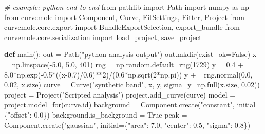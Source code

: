 \documentclass[
  10pt,
  a4paper,
  oneside]{scrreprt}
\newenvironment{Shaded}{}{}
\newcommand{\BuiltInTok}[1]{#1}
\newcommand{\CommentTok}[1]{\textcolor[rgb]{0.38,0.63,0.69}{\textit{#1}}}
\newcommand{\DecValTok}[1]{\textcolor[rgb]{0.25,0.63,0.44}{#1}}
\newcommand{\FloatTok}[1]{\textcolor[rgb]{0.25,0.63,0.44}{#1}}
\newcommand{\ImportTok}[1]{#1}
\newcommand{\KeywordTok}[1]{\textcolor[rgb]{0.00,0.44,0.13}{\textbf{#1}}}
\newcommand{\NormalTok}[1]{#1}
\newcommand{\OperatorTok}[1]{\textcolor[rgb]{0.40,0.40,0.40}{#1}}
\newcommand{\StringTok}[1]{\textcolor[rgb]{0.25,0.44,0.63}{#1}}
\newcommand{\VariableTok}[1]{\textcolor[rgb]{0.10,0.09,0.49}{#1}}
\begin{document}
\begin{Shaded}
\begin{Highlighting}[]
\CommentTok{\# example: python{-}end{-}to{-}end}
\ImportTok{from}\NormalTok{ pathlib }\ImportTok{import}\NormalTok{ Path}
\ImportTok{import}\NormalTok{ numpy }\ImportTok{as}\NormalTok{ np}
\ImportTok{from}\NormalTok{ curvemole }\ImportTok{import}\NormalTok{ Component, Curve, FitSettings, Fitter, Project}
\ImportTok{from}\NormalTok{ curvemole.core.export }\ImportTok{import}\NormalTok{ BundleExportSelection, export\_bundle}
\ImportTok{from}\NormalTok{ curvemole.core.serialization }\ImportTok{import}\NormalTok{ load\_project, save\_project}


\KeywordTok{def}\NormalTok{ main():}
\NormalTok{    out }\OperatorTok{=}\NormalTok{ Path(}\StringTok{"python{-}analysis{-}output"}\NormalTok{)}
\NormalTok{    out.mkdir(exist\_ok}\OperatorTok{=}\VariableTok{False}\NormalTok{)}
\NormalTok{    x }\OperatorTok{=}\NormalTok{ np.linspace(}\OperatorTok{{-}}\FloatTok{5.0}\NormalTok{, }\FloatTok{5.0}\NormalTok{, }\DecValTok{401}\NormalTok{)}
\NormalTok{    rng }\OperatorTok{=}\NormalTok{ np.random.default\_rng(}\DecValTok{1729}\NormalTok{)}
\NormalTok{    y }\OperatorTok{=} \FloatTok{0.4} \OperatorTok{+} \FloatTok{8.0}\OperatorTok{*}\NormalTok{np.exp(}\OperatorTok{{-}}\FloatTok{0.5}\OperatorTok{*}\NormalTok{((x}\OperatorTok{{-}}\FloatTok{0.7}\NormalTok{)}\OperatorTok{/}\FloatTok{0.6}\NormalTok{)}\OperatorTok{**}\DecValTok{2}\NormalTok{)}\OperatorTok{/}\NormalTok{(}\FloatTok{0.6}\OperatorTok{*}\NormalTok{np.sqrt(}\DecValTok{2}\OperatorTok{*}\NormalTok{np.pi))}
\NormalTok{    y }\OperatorTok{+=}\NormalTok{ rng.normal(}\FloatTok{0.0}\NormalTok{, }\FloatTok{0.02}\NormalTok{, x.size)}
\NormalTok{    curve }\OperatorTok{=}\NormalTok{ Curve(}\StringTok{"synthetic band"}\NormalTok{, x, y, sigma\_y}\OperatorTok{=}\NormalTok{np.full(x.size, }\FloatTok{0.02}\NormalTok{))}
\NormalTok{    project }\OperatorTok{=}\NormalTok{ Project(}\StringTok{"Scripted analysis"}\NormalTok{)}
\NormalTok{    project.add\_curve(curve)}
\NormalTok{    model }\OperatorTok{=}\NormalTok{ project.model\_for(curve.}\BuiltInTok{id}\NormalTok{)}
\NormalTok{    background }\OperatorTok{=}\NormalTok{ Component.create(}\StringTok{"constant"}\NormalTok{, initial}\OperatorTok{=}\NormalTok{\{}\StringTok{"offset"}\NormalTok{: }\FloatTok{0.0}\NormalTok{\})}
\NormalTok{    background.is\_background }\OperatorTok{=} \VariableTok{True}
\NormalTok{    peak }\OperatorTok{=}\NormalTok{ Component.create(}\StringTok{"gaussian"}\NormalTok{, initial}\OperatorTok{=}\NormalTok{\{}\StringTok{"area"}\NormalTok{: }\FloatTok{7.0}\NormalTok{, }\StringTok{"center"}\NormalTok{: }\FloatTok{0.5}\NormalTok{, }\StringTok{"sigma"}\NormalTok{: }\FloatTok{0.8}\NormalTok{\})}

\end{Highlighting}
\end{Shaded}
\end{document}
